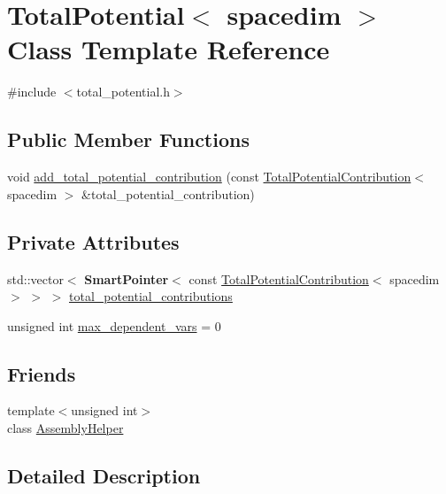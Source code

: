 \hypertarget{class_total_potential}{}\section{Total\+Potential$<$ spacedim $>$ Class Template Reference}
\label{class_total_potential}


{\ttfamily \#include $<$total\+\_\+potential.\+h$>$}

\subsection*{Public Member Functions}
\begin{DoxyCompactItemize}
\item 
void \hyperlink{class_total_potential_ace8b22eef7789f5c7eb78606ba1f110c}{add\+\_\+total\+\_\+potential\+\_\+contribution} (const \hyperlink{class_total_potential_contribution}{Total\+Potential\+Contribution}$<$ spacedim $>$ \&total\+\_\+potential\+\_\+contribution)
\end{DoxyCompactItemize}
\subsection*{Private Attributes}
\begin{DoxyCompactItemize}
\item 
std\+::vector$<$ {\bf Smart\+Pointer}$<$ const \hyperlink{class_total_potential_contribution}{Total\+Potential\+Contribution}$<$ spacedim $>$ $>$ $>$ \hyperlink{class_total_potential_a5a14ce0e2fabf8116566aa67fb11db35}{total\+\_\+potential\+\_\+contributions}
\item 
unsigned int \hyperlink{class_total_potential_a800f9366116679fd0f7d3173a3bfc539}{max\+\_\+dependent\+\_\+vars} = 0
\end{DoxyCompactItemize}
\subsection*{Friends}
\begin{DoxyCompactItemize}
\item 
{\footnotesize template$<$unsigned int$>$ }\\class \hyperlink{class_total_potential_af4019c2e39cc934d646aaa35c3c52773}{Assembly\+Helper}
\end{DoxyCompactItemize}


\subsection{Detailed Description}
